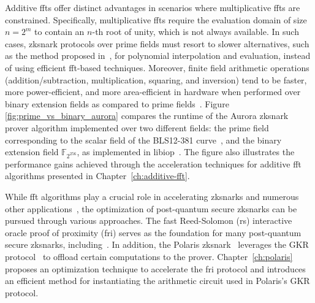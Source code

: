 Additive \glspl{fft} offer distinct advantages in scenarios where multiplicative \glspl{fft} are constrained. Specifically, multiplicative \glspl{fft} require the evaluation domain of size  $n=2^m$ to contain an $n$-th root of unity, which is not always available. In such cases, \gls{zksnark} protocols over prime fields must resort to slower alternatives, such as the method proposed in~\cite{BOSTAN2005Evaluation}, for polynomial interpolation and evaluation, instead of using efficient \gls{fft}-based techniques. Moreover, finite field arithmetic operations (addition/subtraction, multiplication, squaring, and inversion) tend to be faster, more power-efficient, and more area-efficient in hardware when performed over binary extension fields as compared to prime fields~\cite{Wenger2012PrimevsBinary, Diamond2023Towers}.
Figure \ref{fig:prime_vs_binary_aurora} compares the runtime of the Aurora \gls{zksnark}\cite{Aurora2019} prover algorithm implemented over two different fields: the prime field corresponding to the scalar field of the BLS12-381 curve~\cite{BLS_curve2003}, and the binary extension field $\mathbb{F}_{2^{256}}$, as implemented in libiop~\cite{libiop}. The figure also illustrates the performance gains achieved through the acceleration techniques for additive \gls{fft} algorithms presented in Chapter~\ref{ch:additive-fft}.


While \gls{fft} algorithms play a crucial role in accelerating \glspl{zksnark} and numerous other applications~\cite{Bisheh2021NTT,LCH-Fast_Mult2018,LCH-Frobenius2018,BernsteinChouSchwabe2013,BernsteinChou2014}, the optimization of post-quantum secure \glspl{zksnark} can be pursued through various approaches. The fast Reed-Solomon (\gls{rs}) interactive oracle proof of proximity (\gls{fri}) serves as the foundation for many post-quantum secure \glspl{zksnark}, including~\cite{Ben-Sasson2018STARK,Aurora2019,Chiesa2020Fractal,Polaris}. In addition, the Polaris \gls{zksnark}~\cite{Polaris} leverages the GKR protocol~\cite{GKR2008} to offload certain computations to the prover. Chapter~\ref{ch:polaris} proposes an optimization technique to accelerate the \gls{fri} protocol and introduces an efficient method for instantiating the arithmetic circuit used in Polaris's GKR protocol.


